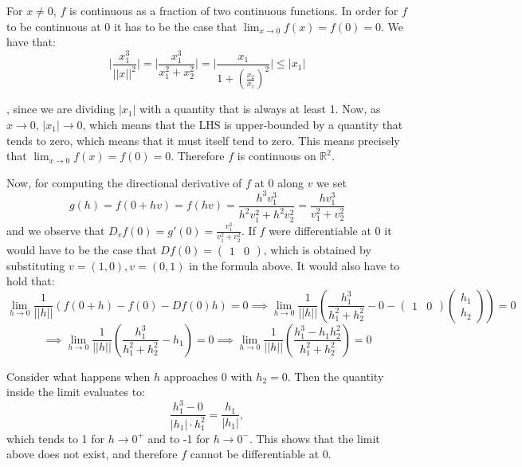 \begin{solution}

    For $x \neq 0$, $f$ is continuous as a fraction of two continuous functions. In order for $f$ to be continuous at 0 it has to be the case that $\lim_{x \rightarrow 0} f(x) = f(0) = 0$. We have that:
    $$\Biggl \lvert \frac{x_1^3}{\lvert \lvert x \rvert \rvert^2} \Biggr \rvert = \Biggl \lvert \frac{x_1^3}{x_1^2 + x_2^2} \Biggr \rvert = \Biggl \lvert \frac{x_1}{1 + (\frac{x_2}{x_1})^2} \Biggr \rvert \leq \lvert x_1 \rvert$$

    , since we are dividing $\lvert x_1 \rvert$ with a quantity that is always at least 1. Now, as $x \rightarrow 0$, $\lvert x_1 \rvert \rightarrow 0$, which means that the LHS is upper-bounded by a quantity that tends to zero, which means that it must itself tend to zero. This means precisely that $\lim_{x \rightarrow 0} f(x) = f(0) = 0$. Therefore $f$ is continuous on $\mathbb{R}^2$.

    Now, for computing the directional derivative of $f$ at 0 along $v$ we set 
    $$g(h) = f(0 + hv) = f(hv) = \frac{h^3v_1^3}{h^2v_1^2 + h^2v_2^2} = \frac{h v_1^3}{v_1^2 + v_2^2}$$
    and we observe that $D_v f(0) = g'(0) = \frac{v_1^3}{v_1^2 + v_2^2}$. 
    If $f$ were differentiable at 0 it would have to be the case that $D f(0) = \begin{pmatrix}
        1 & 0
    \end{pmatrix}$, which is obtained by substituting $v = (1, 0), v = (0, 1)$ in the formula above. 
    It would also have to hold that:
    $$\lim_{h \rightarrow 0} \frac{1}{\lvert \lvert h \rvert \rvert}( f(0 + h) - f(0) - D f(0) h) = 0 \implies \lim_{h \rightarrow 0} \frac{1}{\lvert \lvert h \rvert \rvert}( \frac{h_1^3}{h_1^2 + h_2^2} - 0 - \begin{pmatrix}
        1 & 0
    \end{pmatrix} \begin{pmatrix}
        h_1 \\ h_2
    \end{pmatrix}) = 0$$
    $$\implies \lim_{h \rightarrow 0} \frac{1}{\lvert \lvert h \rvert \rvert}( \frac{h_1^3}{h_1^2 + h_2^2} - h_1) = 0 \implies \lim_{h \rightarrow 0} \frac{1}{\lvert \lvert h \rvert \rvert}( \frac{h_1^3 - h_1h_2^2}{h_1^2 + h_2^2}) = 0$$

    Consider what happens when $h$ approaches 0 with $h_2 = 0$. Then the quantity inside the limit evaluates to:
    $$\frac{h_1^3 - 0}{\lvert h_1 \rvert \cdot h_1^2} = \frac{h_1}{\lvert h_1 \rvert},$$
    which tends to 1 for $h \rightarrow 0^+$ and to -1 for $h \rightarrow 0^-$. This shows that the limit above does not exist, and therefore $f$ cannot be differentiable at 0.


\end{solution}
